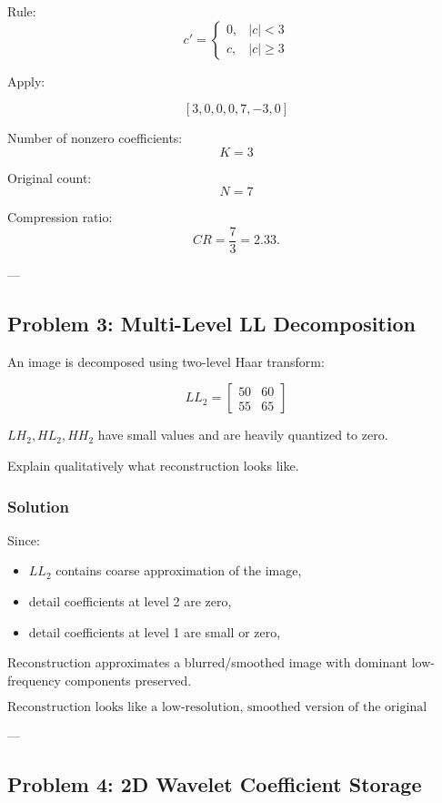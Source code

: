 \documentclass{AnantDocumentation}
\begin{document}
Rule:
\[
c' = 
\begin{cases}
0, & |c| < 3 \\
c, & |c| \ge 3
\end{cases}
\]

Apply:

\[
[3, 0, 0, 0, 7, -3, 0]
\]

Number of nonzero coefficients:
\[
K = 3
\]

Original count:
\[
N = 7
\]

Compression ratio:
\[
CR = \frac{7}{3} = 2.33.
\]

---

\subsection*{Problem 3: Multi-Level LL Decomposition}

An image is decomposed using two-level Haar transform:

\[
LL_2 =
\begin{bmatrix}
50 & 60 \\
55 & 65
\end{bmatrix}
\]

\(LH_2, HL_2, HH_2\) have small values and are heavily quantized to zero.

Explain qualitatively what reconstruction looks like.

\subsubsection*{Solution}

Since:

\begin{itemize}
\item $LL_2$ contains coarse approximation of the image,
\item detail coefficients at level 2 are zero,
\item detail coefficients at level 1 are small or zero,
\end{itemize}

Reconstruction approximates a blurred/smoothed image with dominant low-frequency components preserved.

\[
\boxed{\text{Reconstruction looks like a low-resolution, smoothed version of the original image.}}
\]

---

\subsection*{Problem 4: 2D Wavelet Coefficient Storage}
\end{document}
